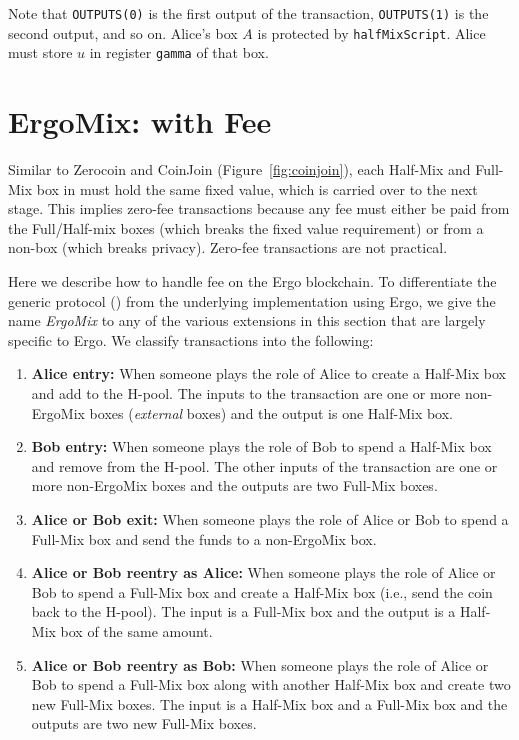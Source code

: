 \documentclass[runningheads]{llncs}
\newcommand{\mixname}{ErgoMix\xspace}
\newcommand{\zerocoin}{Zerocoin\xspace}
\begin{document}
Note that \texttt{OUTPUTS(0)} is the first output of the transaction, \texttt{OUTPUTS(1)} is the second output, and so on. Alice's box $A$ is protected by \texttt{halfMixScript}. Alice must store $u$ in register \texttt{gamma} of that box.


\section{\mixname: \algname with Fee}
\label{fee}

Similar to \zerocoin and CoinJoin (Figure~\ref{fig:coinjoin}), each Half-Mix and Full-Mix box in \algname must hold the same fixed value, which is carried over to the next stage. This implies zero-fee transactions because any fee must either be paid from the Full/Half-mix boxes (which breaks the fixed value requirement) or from a non-\algname box (which breaks privacy). Zero-fee transactions are not practical. 

Here we describe how to handle fee on the Ergo blockchain. To differentiate the generic protocol (\algname) from the underlying implementation using Ergo, we give the name {\em \mixname} to any of the various extensions in this section that are largely specific to Ergo. 
We classify \algname transactions into the following:

\begin{enumerate}
    \item \textbf{Alice entry:} When someone plays the role of Alice to create a Half-Mix box and add to the H-pool. The inputs to the transaction are one or more non-\mixname boxes ({\em external} boxes) and the output is one Half-Mix box. 
    \item \textbf{Bob entry:} When someone plays the role of Bob to spend a Half-Mix box and remove from the H-pool. The other inputs of the transaction are one or more non-\mixname boxes and the outputs are two Full-Mix boxes. 
    \item \textbf{Alice or Bob exit:} When someone plays the role of Alice or Bob to spend a Full-Mix box and send the funds to a non-\mixname box. 
    \item \textbf{Alice or Bob reentry as Alice:} When someone plays the role of Alice or Bob to spend a Full-Mix box and create a Half-Mix box (i.e., send the coin back to the H-pool). The input is a Full-Mix box and the output is a Half-Mix box of the same amount.
    \item \textbf{Alice or Bob reentry as Bob:} When someone plays the role of Alice or Bob to spend a Full-Mix box along with another Half-Mix box and create two new Full-Mix boxes. The input is a Half-Mix box and a Full-Mix box and the outputs are two new Full-Mix boxes.
\end{enumerate}
\end{document}
